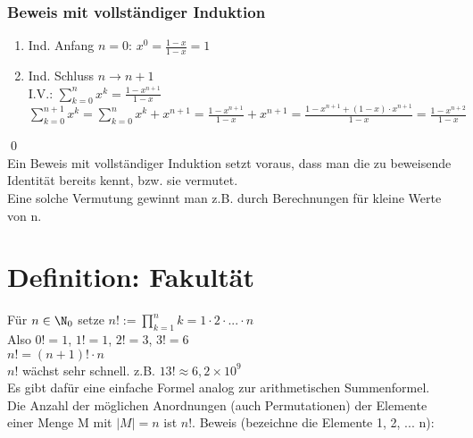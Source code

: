 \subsubsection*{Beweis mit vollständiger Induktion}
\begin{enumerate}
\item Ind. Anfang $n = 0$: $x^0 = \frac{1 - x}{1 - x} = 1$
\item Ind. Schluss $n \to n + 1$\\
I.V.: $\sum_{k = 0}^{n} x^k = \frac{1 - x^{n+1}}{1 - x}$\\
\Rarr $\sum_{k = 0}^{n + 1} x^k = \sum_{k = 0}^{n} x^k + x^{n+1} = \frac{1 - x^{n+1}}{1 - x} + x^{n+1} 
= \frac{1 - x^{n+1} + (1-x)\cdot x^{n+1}}{1 - x} = \frac{1 - x^{n+2}}{1 - x}$
\end{enumerate}
\qed\\
Ein Beweis mit vollständiger Induktion setzt voraus, dass man die zu beweisende Identität bereits kennt, bzw. sie vermutet.\\
Eine solche Vermutung gewinnt man z.B. durch Berechnungen für kleine Werte von n.
\section{Definition: Fakultät}
Für $n \in \N_0$ setze $n! := \prod_{k=1}^{n} k = 1 \cdot 2 \cdot ... \cdot n$\\
Also $0! = 1$, $1! = 1$, $2! = 3$, $3! = 6$\\
$n! = (n+1)! \cdot n$\\
$n!$ wächst sehr schnell. z.B. $13! \approx 6,2 \times 10^9$\\
Es gibt dafür eine einfache Formel analog zur arithmetischen Summenformel.\\
\Satz
Die Anzahl der möglichen Anordnungen (auch Permutationen) der Elemente einer Menge M mit $|M| = n$ ist $n!$.
Beweis (bezeichne die Elemente 1, 2, ... n):
